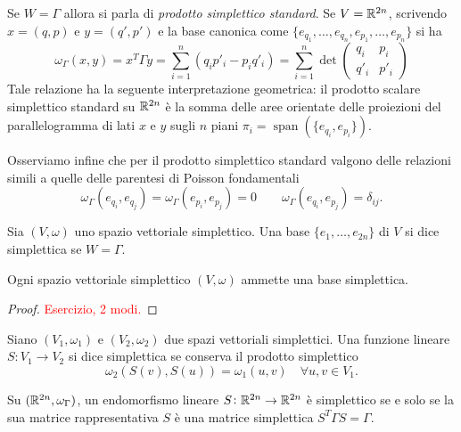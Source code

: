 Se $ W = \Gamma $ allora si parla di \emph{prodotto simplettico standard}. Se $ V = \mathbb{R}^{2n} $, scrivendo $ x = (q, p) $ e $ y = (q', p') $ e la base canonica come $ \{e_{q_1}, \ldots, e_{q_n}, e_{p_1}, \ldots, e_{p_n}\} $ si ha
\begin{equation}
    \omega_\Gamma(x, y) = x^T \Gamma y = \sum_{i=1}^{n} \left(q_i p'_i - p_i q'_i\right) =
    \sum_{i=1}^{n}
    \det{
    \begin{pmatrix}
    q_i & p_i \\
    q'_i & p'_i
    \end{pmatrix}
    }
\end{equation}
Tale relazione ha la seguente interpretazione geometrica: il prodotto scalare simplettico standard su $ \mathbb{R}^{2n} $ è la somma delle aree orientate delle proiezioni del parallelogramma di lati $ x $ e $ y $ sugli $ n $ piani $ \pi_i = \operatorname{span}\left(\{e_{q_i}, e_{p_i}\}\right) $.

Osserviamo infine che per il prodotto simplettico standard valgono delle relazioni simili a quelle delle parentesi di Poisson fondamentali
\begin{equation}
    \omega_\Gamma(e_{q_i}, e_{q_j}) = \omega_\Gamma(e_{p_i}, e_{p_j}) = 0 \qquad \omega_\Gamma(e_{q_i}, e_{p_j}) = \delta_{ij}.
\end{equation}

\begin{definition}
    Sia $ (V, \omega) $ uno spazio vettoriale simplettico. Una base $ \{e_1, \ldots, e_{2n}\} $ di $ V $ si dice simplettica se $ W = \Gamma $.
\end{definition}

\begin{thm}
    Ogni spazio vettoriale simplettico $ (V, \omega) $ ammette una base simplettica.
\end{thm}
\begin{proof}
    \textcolor{red}{Esercizio, 2 modi.}
\end{proof}

\begin{definition}
    Siano $ (V_1, \omega_1) $ e $ (V_2, \omega_2) $ due spazi vettoriali simplettici. Una funzione lineare $ S \colon V_1 \to V_2 $ si dice simplettica se conserva il prodotto simplettico
    \[
        \omega_2(S(v), S(u)) = \omega_1(u, v) \quad \forall u, v \in V_1.
    \]
\end{definition}

\begin{proposition}
    Su $ (\mathbb{R}^{2n}, \omega_\Gamma) $, un endomorfismo lineare $ S \colon \mathbb{R}^{2n} \to \mathbb{R}^{2n} $ è simplettico se e solo se la sua matrice rappresentativa $ S $ è una matrice simplettica $ S^T \Gamma S = \Gamma $.
\end{proposition}

